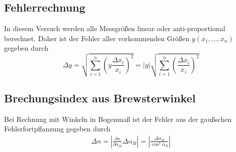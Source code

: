 \label{anhang}

\subsection{Fehlerrechnung}
In diesem Versuch werden alle Messgrößen linear oder anti-proportional berechnet. Daher ist der Fehler aller vorkommenden Größen $ y(x_1, \dots, x_n) $ gegeben durch
\begin{equation}
	\Delta y = \sqrt{\sum_{i=1}^{n}\left(y\frac{\Delta x_i}{x_i}\right)^2} 
		= |y|\sqrt{\sum_{i=1}^{n}\left(\frac{\Delta x_i}{x_i}\right)^2}  \label{eq:err}
\end{equation}
\subsection{Brechungsindex aus Brewsterwinkel}
Bei Rechnung mit Winkeln in Bogenmaß ist der Fehler aus der gaußschen Fehlerfortpflanzung gegeben durch
\begin{align}
	\Delta n = \left|\frac{\partial n}{\partial \alpha_B}\Delta \alpha_B\right| 
	=  \left|\frac{\Delta\alpha_B}{\cos^2\alpha_B}\right| \label{eq:err:brew}
\end{align}


%
%
